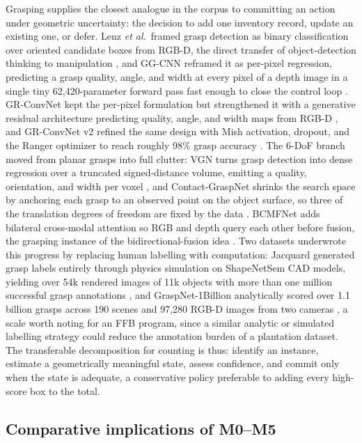 Grasping supplies the closest analogue in the corpus to committing an action under geometric uncertainty: the decision to add one inventory record, update an existing one, or defer. Lenz \textit{et al.}\ framed grasp detection as binary classification over oriented candidate boxes from RGB-D, the direct transfer of object-detection thinking to manipulation \cite{lenz2015grasp}, and GG-CNN reframed it as per-pixel regression, predicting a grasp quality, angle, and width at every pixel of a depth image in a single tiny 62{,}420-parameter forward pass fast enough to close the control loop \cite{morrison2018ggcnn}. GR-ConvNet kept the per-pixel formulation but strengthened it with a generative residual architecture predicting quality, angle, and width maps from RGB-D \cite{kumra2020grconvnet}, and GR-ConvNet v2 refined the same design with Mish activation, dropout, and the Ranger optimizer to reach roughly 98\% grasp accuracy \cite{kumra2022grconvnetv2}. The 6-DoF branch moved from planar grasps into full clutter: VGN turns grasp detection into dense regression over a truncated signed-distance volume, emitting a quality, orientation, and width per voxel \cite{breyer2021vgn}, and Contact-GraspNet shrinks the search space by anchoring each grasp to an observed point on the object surface, so three of the translation degrees of freedom are fixed by the data \cite{sundermeyer2021contactgraspnet}. BCMFNet adds bilateral cross-modal attention so RGB and depth query each other before fusion, the grasping instance of the bidirectional-fusion idea \cite{zhang2023bcmfnet}. Two datasets underwrote this progress by replacing human labelling with computation: Jacquard generated grasp labels entirely through physics simulation on ShapeNetSem CAD models, yielding over 54k rendered images of 11k objects with more than one million successful grasp annotations \cite{depierre2018jacquard}, and GraspNet-1Billion analytically scored over 1.1 billion grasps across 190 scenes and 97{,}280 RGB-D images from two cameras \cite{fang2020graspnet}, a scale worth noting for an FFB program, since a similar analytic or simulated labelling strategy could reduce the annotation burden of a plantation dataset. The transferable decomposition for counting is thus: identify an instance, estimate a geometrically meaningful state, assess confidence, and commit only when the state is adequate, a conservative policy preferable to adding every high-score box to the total.



\subsection{Comparative implications of M0--M5}

